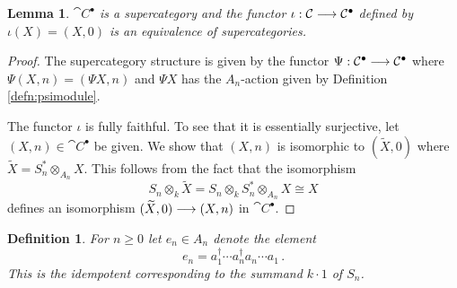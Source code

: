 \documentclass[english,letter paper,12pt,leqno]{article}
\newtheorem{lemma}[theorem]{Lemma}
\theoremstyle{example}
\newtheorem{definition}[theorem]{Definition}
\numberwithin{equation}{section}
\begin{document}
\begin{lemma} $\cat{C}^\bullet$ is a supercategory and the functor $\iota: \mathcal{C} \longrightarrow \mathcal{C}^\bullet$ defined by $\iota(X) = (X,0)$ is an equivalence of supercategories.
\end{lemma}
\begin{proof}
The supercategory structure is given by the functor $\Psi: \mathcal{C}^\bullet \longrightarrow \mathcal{C}^\bullet$ where $\Psi(X,n) = ( \Psi X, n )$ and $\Psi X$ has the $A_n$-action given by Definition \ref{defn:psimodule}. 

The functor $\iota$ is fully faithful. To see that it is essentially surjective, let $(X,n) \in \cat{C}^\bullet$ be given. We show that $(X,n)$ is isomorphic to $(\widetilde{X},0)$ where $\widetilde{X} = S_n^* \otimes_{A_n} X$. This follows from the fact that the isomorphism
\[
S_n \otimes_k \widetilde{X} = S_n \otimes_k S_n^* \otimes_{A_n} X \cong X
\]
defines an isomorphism $(\widetilde{X}, 0) \longrightarrow (X,n)$ in $\cat{C}^\bullet$.
\end{proof}

\begin{definition}\label{defn:idempotent_e} For $n \ge 0$ let $e_n \in A_n$ denote the element
\[
e_n = a_1^\dagger \cdots a_n^\dagger a_n \cdots a_1\,.
\]
This is the idempotent corresponding to the summand $k \cdot 1$ of $S_n$.
\end{definition}
\end{document}
